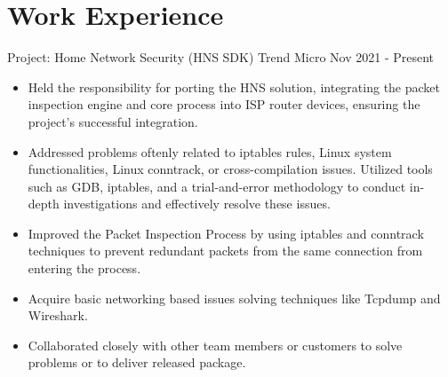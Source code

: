 \section{Work Experience}

{Project: Home Network Security (HNS SDK)}
{Trend Micro}
{Nov 2021 - Present}

\begin{itemize}

  \item Held the responsibility for porting the HNS solution, integrating the packet inspection engine and core process into ISP router devices, ensuring the project's successful integration.
  \item Addressed problems oftenly related to iptables rules, Linux system functionalities, Linux conntrack, or cross-compilation issues. Utilized tools such as GDB, iptables, and a trial-and-error methodology to conduct in-depth investigations and effectively resolve these issues.
  \item Improved the Packet Inspection Process by using iptables and conntrack techniques to prevent redundant packets from the same connection from entering the process.
  \item Acquire basic networking based issues solving techniques like Tcpdump and Wireshark.
  \item Collaborated closely with other team members or customers to solve problems or to deliver released package.
\end{itemize}


